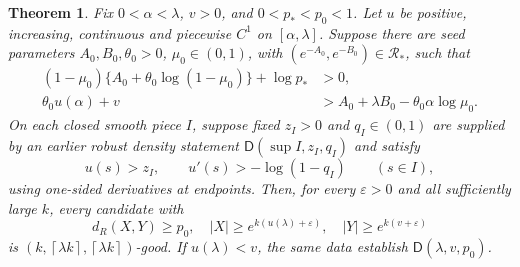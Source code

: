 \documentclass[11pt]{article}
\newtheorem{theorem}{Theorem}[section]
\theoremstyle{definition}
\theoremstyle{remark}
\newcommand{\RR}{\mathcal R}
\newcommand{\D}{\mathsf D}
\newcommand{\ceil}[1]{\left\lceil #1\right\rceil}
\numberwithin{equation}{section}
\begin{document}
\begin{theorem}\label{thm:continuation}
Fix $0<\alpha<\lambda$, $v>0$, and $0<p_*<p_0<1$. Let $u$ be positive, increasing, continuous and piecewise $C^1$ on $[\alpha,\lambda]$. Suppose there are seed parameters $A_0,B_0,\theta_0>0$, $\mu_0\in(0,1)$, with $(e^{-A_0},e^{-B_0})\in\RR_*$, such that
\begin{align}
 (1-\mu_0)\{A_0+\theta_0\log(1-\mu_0)\}+\log p_*&>0,\label{eq:seed-density}\\
 \theta_0u(\alpha)+v&>A_0+\lambda B_0-\theta_0\alpha\log\mu_0.\label{eq:seed-budget}
\end{align}
On each closed smooth piece $I$, suppose fixed $z_I>0$ and $q_I\in(0,1)$ are supplied by an earlier robust density statement $\D(\sup I,z_I,q_I)$ and satisfy
\begin{equation}\label{eq:continuation-conditions}
 u(s)>z_I,\qquad u'(s)>-\log(1-q_I)\qquad(s\in I),
\end{equation}
using one-sided derivatives at endpoints. Then, for every $\varepsilon>0$ and all sufficiently large $k$, every candidate with
\[
 d_R(X,Y)\ge p_0,\quad
 |X|\ge e^{k(u(\lambda)+\varepsilon)},\quad
 |Y|\ge e^{k(v+\varepsilon)}
\]
is $(k,\ceil{\lambda k},\ceil{\lambda k})$-good.
If $u(\lambda)<v$, the same data establish $\D(\lambda,v,p_0)$.
\end{theorem}
\end{document}
